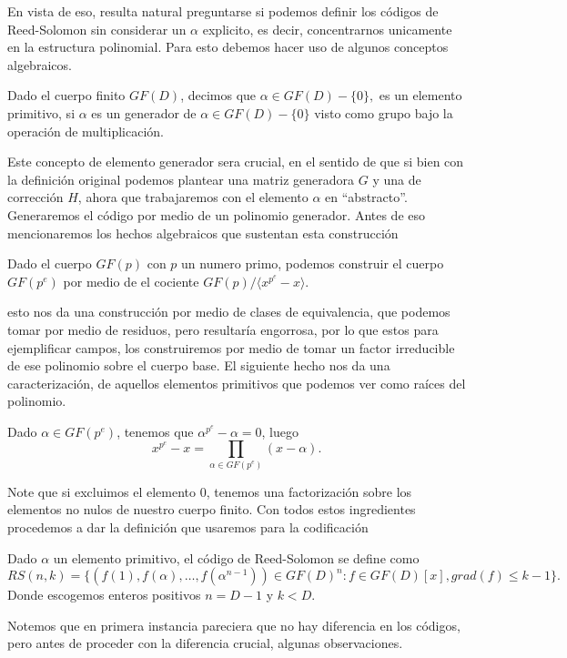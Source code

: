 En vista de eso, resulta natural preguntarse si podemos definir los códigos de Reed-Solomon sin considerar un $\alpha$ explicito, es decir, concentrarnos unicamente en la estructura polinomial. Para esto debemos hacer uso de algunos conceptos algebraicos.

\begin{definition}
    Dado el cuerpo finito $GF(D)$, decimos que $\alpha\in GF(D)-\{0\},$ es un elemento primitivo, si $\alpha$ es un generador de $\alpha\in GF(D)-\{0\}$ visto como grupo bajo la operación de multiplicación.  
\end{definition}

Este concepto de elemento generador sera crucial, en el sentido de que si bien con la definición original podemos plantear una matriz generadora $G$ y una de corrección $H$, ahora que trabajaremos con el elemento $\alpha$ en ``abstracto''. Generaremos el código por medio de un polinomio generador. Antes de eso mencionaremos los hechos algebraicos que sustentan esta construcción
\begin{prop}
    Dado el cuerpo $GF(p)$ con $p$ un numero primo, podemos construir el cuerpo $GF(p^e)$ por medio de el cociente $GF(p)/\langle x^{p^e}-x\rangle$.
\end{prop}
esto nos da una construcción por medio de clases de equivalencia, que podemos tomar por medio de residuos, pero resultaría engorrosa, por lo que estos para ejemplificar campos, los construiremos por medio de tomar un factor irreducible de ese polinomio sobre el cuerpo base. El siguiente hecho nos da una caracterización, de aquellos elementos primitivos que podemos ver como raíces del polinomio.
\begin{prop}
    Dado $\alpha\in GF(p^e)$, tenemos que $\alpha^{p^e}-\alpha=0$, luego 
    $$x^{p^e}-x=\prod_{\alpha\in GF(p^e) }(x-\alpha).$$
\end{prop}
Note que si excluimos el elemento $0$, tenemos una factorización sobre los elementos no nulos de nuestro cuerpo finito. Con todos estos ingredientes procedemos a dar la definición que usaremos para la codificación
\begin{definition}
  Dado $\alpha$ un elemento primitivo, el código de Reed-Solomon se define como
  $$RS(n,k)=\{(f(1),f(\alpha),\ldots,f(\alpha^{n-1}))\in GF(D)^n:f\in GF(D)[x], grad(f)\leq k-1\}.$$
  Donde escogemos enteros positivos $n=D-1$ y $k<D.$
\end{definition}
Notemos que en primera instancia pareciera que no hay diferencia en los códigos, pero antes de proceder con la diferencia crucial, algunas observaciones.
